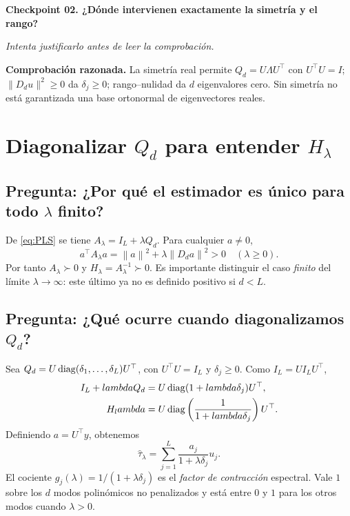 \documentclass[11pt,letterpaper,parskip=half,headings=small]{scrartcl}
\theoremstyle{definition}\newtheorem{definicion}[proposicion]{Definición}
\theoremstyle{remark}\newtheorem{observacion}[proposicion]{Observación}
\newcommand{\norm}[1]{\left\lVert#1\right\rVert}\newcommand{\inner}[2]{\left\langle#1,#2\right\rangle}
\newcommand{\pregunta}[1]{\subsection{Pregunta: #1}}
\newcommand{\checkpoint}[3]{%
  \par\medskip\noindent\textbf{\color{blue!45!black}Checkpoint #1. #2}\par
  \noindent\emph{Intenta justificarlo antes de leer la comprobación.}\par
  \noindent\textbf{Comprobación razonada. }#3\par\bigskip
}
\begin{document}
\checkpoint{02}{¿Dónde intervienen exactamente la simetría y el rango?}{La simetría real permite $Q_d=U\Lambda U^\top$ con $U^\top U=I$; $\|D_du\|^2\ge0$ da $\delta_j\ge0$; rango--nulidad da $d$ eigenvalores cero. Sin simetría no está garantizada una base ortonormal de eigenvectores reales.}

\section{Diagonalizar $Q_d$ para entender $H_\lambda$}
\pregunta{¿Por qué el estimador es único para todo $\lambda$ finito?}
De \eqref{eq:PLS} se tiene $A_\lambda=I_L+\lambda Q_d$. Para cualquier $a\neq0$,
\[
a^\top A_\lambda a=\norm a^2+\lambda\norm{D_da}^2>0\quad(\lambda\geq0).
\]
Por tanto $A_\lambda\succ0$ y $H_\lambda=A_\lambda^{-1}\succ0$. Es importante distinguir el caso \emph{finito} del límite $\lambda\to\infty$: este último ya no es definido positivo si $d<L$.

\pregunta{¿Qué ocurre cuando diagonalizamos $Q_d$?}
Sea $Q_d=U\operatorname{diag}(\delta_1,\ldots,\delta_L)U^\top$, con $U^\top U=I_L$ y $\delta_j\geq0$. Como $I_L=UI_LU^\top$,
\begin{align}
I_L+lambda Q_d&=U\operatorname{diag}(1+lambda\delta_j)U^\top,\\
H_lambda&=U\operatorname{diag}\left(\frac{1}{1+lambda\delta_j}\right)U^\top.\label{eq:spectral}
\end{align}
Definiendo $a=U^\top y$, obtenemos
\begin{equation}\label{eq:spectral-fit}
\widehat\tau_\lambda=\sum_{j=1}^L\frac{a_j}{1+\lambda\delta_j}u_j.
\end{equation}
El cociente $g_j(\lambda)=1/(1+\lambda\delta_j)$ es el \emph{factor de contracción} espectral. Vale $1$ sobre los $d$ modos polinómicos no penalizados y está entre $0$ y $1$ para los otros modos cuando $\lambda>0$.
\end{document}
